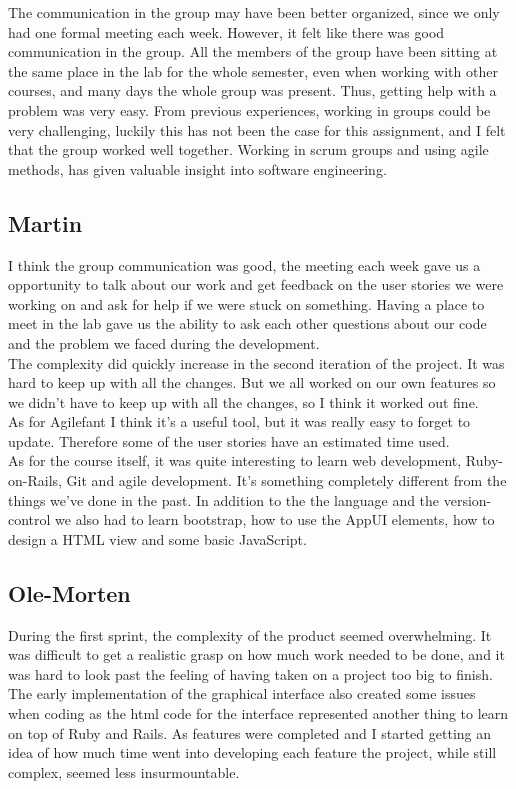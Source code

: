 \documentclass[a4paper]{article}
\begin{document}
\noindent
The communication in the group may have been better organized, since we only had one formal meeting each week. However, it felt like there was good communication in the group. All the members of the group have been sitting at the same place in the lab for the whole semester, even when working with other courses, and many days the whole group was present. Thus, getting help with a problem was very easy.
From previous experiences, working in groups could be very challenging, luckily this has not been the case for this assignment, and I felt that the group worked well together. Working in scrum groups and using agile methods, has given valuable insight into software engineering.  \\

\subsection{Martin}
I think the group communication was good, the meeting each week gave us a opportunity to talk about our work and get feedback on the user stories we were working on and ask for help if we were stuck on something. Having a place to meet in the lab gave us the ability to ask each other questions about our code and the problem we faced during the development. \\ 
The complexity did quickly increase in the second iteration of the project. It was hard to keep up with all the changes. But we all worked on our own features so we didn't have to keep up with all the changes, so I think it worked out fine. \\
As for Agilefant I think it's a useful tool, but it was really easy to forget to update. Therefore some of the user stories have an estimated time used. \\

\noindent
As for the course itself, it was quite interesting to learn web development, Ruby-on-Rails, Git and agile development. It's something completely different from the things we've done in the past. In addition to the the language and the version-control we also had to learn bootstrap, how to use the AppUI elements, how to design a HTML view and some basic JavaScript. 

\subsection{Ole-Morten}
\noindent
During the first sprint, the complexity of the product seemed overwhelming. It was difficult to get a realistic grasp on how much work needed to be done, and it was hard to look past the feeling of having taken on a project too big to finish. The early implementation of the graphical interface also created some issues when coding as the html code for the interface represented another thing to learn on top of Ruby and Rails. As features were completed and I started getting an idea of how much time went into developing each feature the project, while still complex, seemed less insurmountable.\\
\end{document}
